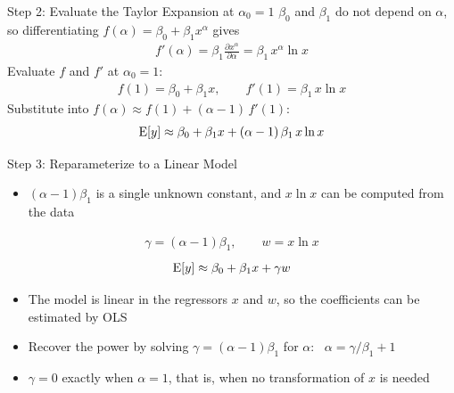 \begin{frame}{Step 2: Evaluate the Taylor Expansion at $\alpha_0 = 1$}
$\beta_0$ and $\beta_1$ do not depend on $\alpha$, so differentiating $f(\alpha) = \beta_0 + \beta_1 x^\alpha$ gives
\begin{align*}
    f'(\alpha) = \beta_1 \frac{\partial x^\alpha}{\partial \alpha} = \beta_1\, x^\alpha \ln x
\end{align*}
Evaluate $f$ and $f'$ at $\alpha_0 = 1$:
\begin{align*}
    f(1) = \beta_0 + \beta_1 x, \qquad f'(1) = \beta_1\, x \ln x
\end{align*}
Substitute into $f(\alpha) \approx f(1) + (\alpha - 1)\, f'(1)$:
\begin{align*}
    \operatorname{E}[y] \approx \beta_0 + \beta_1 x + (\alpha - 1)\,\beta_1\, x \ln x
\end{align*}
\end{frame}


\begin{frame}{Step 3: Reparameterize to a Linear Model}
\begin{itemize}
    \item $(\alpha - 1)\beta_1$ is a single unknown constant, and $x \ln x$ can be computed from the data
\end{itemize}
\begin{align*}
    \gamma = (\alpha - 1)\beta_1, \qquad w = x \ln x
\end{align*}
\begin{align*}
    \operatorname{E}[y] \approx \beta_0 + \beta_1 x + \gamma w
\end{align*}
\begin{itemize}
    \item The model is linear in the regressors $x$ and $w$, so the coefficients can be estimated by OLS
    \item Recover the power by solving $\gamma = (\alpha - 1)\beta_1$ for $\alpha$: \ $\alpha = \gamma/\beta_1 + 1$
    \item $\gamma = 0$ exactly when $\alpha = 1$, that is, when no transformation of $x$ is needed
\end{itemize}
\end{frame}


